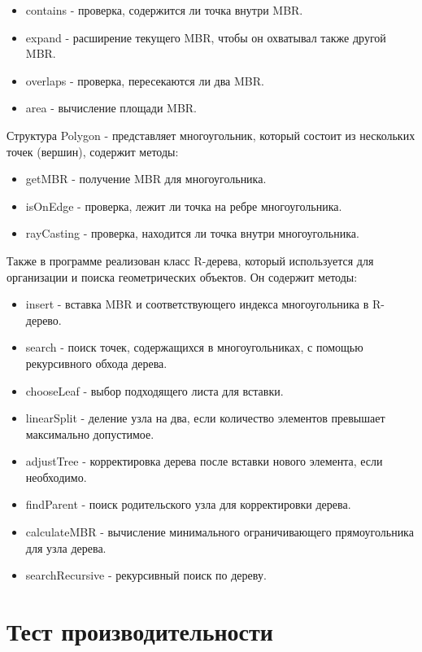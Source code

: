 \documentclass[12pt]{article}
\begin{document}
\begin{itemize}
    \item contains - проверка, содержится ли точка внутри MBR.
    \item expand - расширение текущего MBR, чтобы он охватывал также другой MBR.
    \item overlaps - проверка, пересекаются ли два MBR.
    \item area - вычисление площади MBR.
\end{itemize}
Структура Polygon - представляет многоугольник, который состоит из нескольких точек (вершин), содержит методы:
\begin{itemize}
    \item getMBR - получение MBR для многоугольника.
    \item isOnEdge - проверка, лежит ли точка на ребре многоугольника.
    \item rayCasting - проверка, находится ли точка внутри многоугольника.
\end{itemize}

Также в программе реализован класс R-дерева, который используется для организации и поиска геометрических объектов. Он содержит методы:
\begin{itemize}
    \item insert - вставка MBR и соответствующего индекса многоугольника в R-дерево.
    \item search - поиск точек, содержащихся в многоугольниках, с помощью рекурсивного обхода дерева.
    \item chooseLeaf - выбор подходящего листа для вставки.
    \item linearSplit - деление узла на два, если количество элементов превышает максимально допустимое.
    \item adjustTree - корректировка дерева после вставки нового элемента, если необходимо.
    \item findParent - поиск родительского узла для корректировки дерева.
    \item calculateMBR - вычисление минимального ограничивающего прямоугольника для узла дерева.
    \item searchRecursive - рекурсивный поиск по дереву.
\end{itemize}

\newpage
\section*{Тест производительности}
\end{document}
